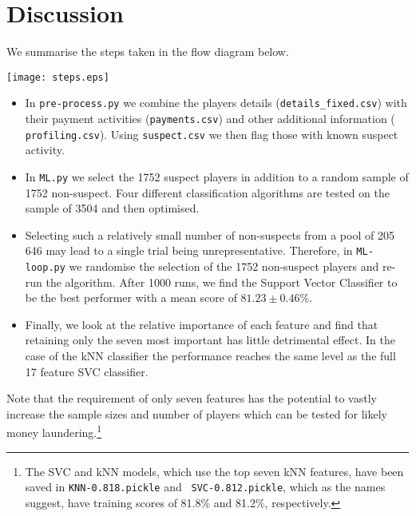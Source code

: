 \documentclass[11pt]{article} %
\begin{document}
\section{Discussion}

 We summarise the steps taken in the flow diagram below.

\begin{minipage}[l]{0.5\linewidth}
\texttt{[image: steps.eps]}
\end{minipage}\hfill
\begin{minipage}[l]{0.45\linewidth}
 
  \begin{itemize}

  \item In {\tt pre-process.py} we combine the players details ({\tt details\_fixed.csv}) with their
    payment activities ({\tt payments.csv}) and other additional information ({\tt
      profiling.csv}). Using {\tt suspect.csv} we then flag those with known suspect activity.

  \item In {\tt ML.py} we select the 1752 suspect players in addition to a random sample of 1752
    non-suspect. Four different classification algorithms are tested on the sample of 3504 and then
    optimised.

  \item Selecting such a relatively small number of non-suspects from a pool of 205\,646 may lead to
    a single trial being unrepresentative. Therefore, in {\tt ML-loop.py} we randomise the selection
    of the 1752 non-suspect players and re-run the algorithm. After 1000 runs, we find the Support
    Vector Classifier to be the best performer with a mean score of $81.23\pm0.46$\%.
    \end{itemize}
\end{minipage}
\begin{itemize}
\item Finally, we look at the relative importance of each feature and find that retaining only the
  seven most important has little detrimental effect. In the case of the kNN classifier the
  performance reaches the same level as the full 17 feature SVC classifier.
   \end{itemize}

Note that the requirement of only seven features has the potential to vastly increase the sample
sizes and number of players which can be tested for likely money laundering.\footnote{The SVC and
kNN models, which use the top seven kNN features, have been saved in {\tt KNN-0.818.pickle} and {\tt
  SVC-0.812.pickle}, which as the names suggest, have training scores of 81.8\% and 81.2\%,
respectively.}
\end{document}
